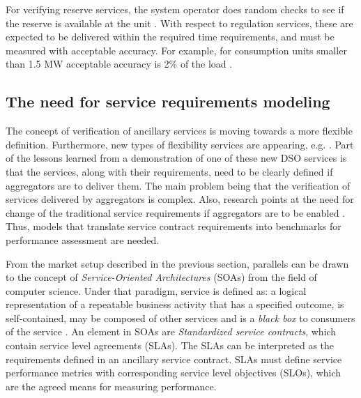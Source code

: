 For verifying reserve services, the system operator does random checks to see if the reserve is available at the unit \cite{EnerginetAncillary}. %
With respect to regulation services, these are expected to be delivered within the required time requirements, and must be measured with acceptable accuracy. For example, for consumption units smaller than 1.5 MW acceptable accuracy is 2\% of the load \cite{Energinettek}.


\subsection{The need for service requirements modeling}\label{subsec:needforreq}
The concept of verification of ancillary services is moving towards a more flexible definition. Furthermore, new types of flexibility services are appearing, e.g. \cite{tougaard2015flech,heussen2013clearinghouse}. Part of the lessons learned from a demonstration of one of these new DSO services \cite{ipowerdemo,bondy2014powermax} is that the services, along with their requirements, need to be clearly defined if aggregators are to deliver them. The main problem being that the verification of services delivered by aggregators is complex.
Also, research points at the need for change of the traditional service requirements if aggregators are to be enabled \cite{macdonald2012demand,koliou2014demand}. Thus, models that translate service contract requirements into benchmarks for performance assessment are needed.

From the market setup described in the previous section, parallels can be drawn to the concept of \emph{Service-Oriented Architectures} (SOAs) from the field of computer science. Under that paradigm, service is defined as: a logical representation of a repeatable business activity that has a specified outcome, is self-contained, may be composed of other services and is a \emph{black box} to consumers of the service \cite{opengroupsoa}. An element in SOAs are \emph{Standardized service contracts}, which contain service level agreements (SLAs). The SLAs can be interpreted as the requirements defined in an ancillary service contract. SLAs must define service performance metrics with corresponding service level objectives (SLOs), which are the agreed means for measuring performance.

